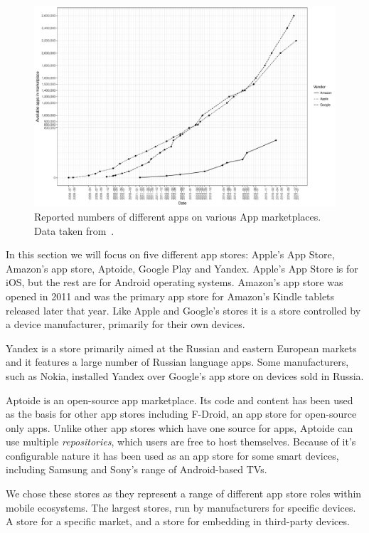 \documentclass[thesis.tex]{subfiles}
\begin{document}
\begin{figure}
  \includegraphics[width=\textwidth]{figures/app-store-apps.pdf}
  \caption[Reported numbers of different apps on various App marketplaces.]{%
    Reported numbers of different apps on various App marketplaces. Data taken from~\cite{statista_google_nodate,statista_apple_nodate,statista_amazon_nodate}.}
  \label{fig:app-store-apps}
\end{figure}

In this section we will focus on five different app stores: Apple's App Store,
Amazon's app store, Aptoide, Google Play and Yandex.  Apple's App Store is for iOS,
but the rest are for Android operating systems.  
Amazon's app store was opened in 2011 and was the primary app store for Amazon's
Kindle tablets released later that year.  Like Apple and Google's stores it is a
store controlled by a device manufacturer, primarily for their own devices.

Yandex is a store primarily aimed at
the Russian and eastern European markets and it features a large number of
Russian language apps.  Some manufacturers, such as Nokia, installed Yandex over
Google's app store on devices sold in Russia. 

Aptoide is an open-source app marketplace.  Its code and content has been used as the basis for
other app stores including F-Droid, an app store for open-source only apps.
Unlike other app stores which have one source for apps, Aptoide can use multiple
\emph{repositories}, which users are free to host themselves.  Because of it's
configurable nature it has been used as an app store for some smart devices,
including Samsung and Sony's range of Android-based TVs.

We chose these stores as they represent a range of different app store roles
within mobile ecosystems.  The largest stores, run by manufacturers for specific
devices.  A store for a specific market, and a store for embedding in
third-party devices.
\end{document}
